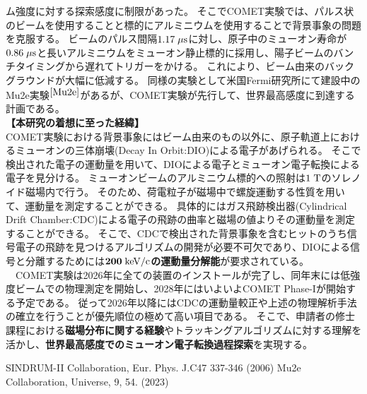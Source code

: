 \documentclass[11pt,a4j,dvipdfmx]{jarticle} 					%
\newcommand{\研究課題名}{ミューオン電子転換探索の感度向上に向けた解析手法の開発}
\newcommand{\研究機関名}{大阪大学}
\newcommand{\研究代表者氏名}{高見 翔太   }
\begin{document}
ム強度に対する探索感度に制限があった。
そこでCOMET実験では、パルス状のビームを使用することと標的にアルミニウムを使用することで背景事象の問題を克服する。
ビームのパルス間隔$1.17\;\rm{\mu s}$に対し、原子中のミューオン寿命が$0.86\;\rm{\mu s}$と長いアルミニウムをミューオン静止標的に採用し、陽子ビームのバンチタイミングから遅れてトリガーをかける。
これにより、ビーム由来のバックグラウンドが大幅に低減する。
同様の実験として米国Fermi研究所にて建設中のMu2e実験$^{\cite{Mu2e}}$があるが、COMET実験が先行して、世界最高感度に到達する計画である。\\
\noindent \textbf{【本研究の着想に至った経緯】}\\
COMET実験における背景事象にはビーム由来のもの以外に、原子軌道上におけるミューオンの三体崩壊(Decay In Orbit:DIO)による電子があげられる。
そこで検出された電子の運動量を用いて、DIOによる電子とミューオン電子転換による電子を見分ける。
ミューオンビームのアルミニウム標的への照射は$1\;\rm{T}$のソレノイド磁場内で行う。
そのため、荷電粒子が磁場中で螺旋運動する性質を用いて、運動量を測定することができる。
具体的にはガス飛跡検出器(Cylindrical Drift Chamber:CDC)による電子の飛跡の曲率と磁場の値よりその運動量を測定することができる。
そこで、CDCで検出された背景事象を含むヒットのうち信号電子の飛跡を見つけるアルゴリズムの開発が必要不可欠であり、DIOによる信号と分離するためには\textbf{$\mathbf{200\;\rm{keV/c}}$の運動量分解能}が要求されている。\\
　COMET実験は2026年に全ての装置のインストールが完了し、同年末には低強度ビームでの物理測定を開始し、2028年にはいよいよCOMET Phase-Iが開始する予定である。
従って2026年以降にはCDCの運動量較正や上述の物理解析手法の確立を行うことが優先順位の極めて高い項目である。
そこで、申請者の修士課程における\textbf{磁場分布に関する経験}やトラッキングアルゴリズムに対する理解を活かし、\textbf{世界最高感度でのミューオン電子転換過程探索}を実現する。

\small
\begin{thebibliography}{99}
	 SINDRUM-II Collaboration, Eur. Phys. J.C47 337-346 (2006)
	Mu2e Collaboration, Universe, 9, 54. (2023) 
\end{thebibliography}
\end{document}
